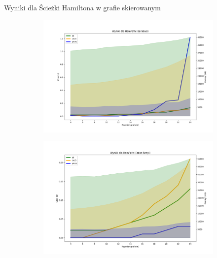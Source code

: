 \begin{frame}{Wyniki dla Ścieżki Hamiltona w grafie skierowanym}
\begin{figure}[htbp]
	\centering
	\begin{subfigure}[b]{0.5\textwidth}
		\includegraphics[width=\textwidth]{../thesis/figures/1-barabasi-plot.png}
	\end{subfigure}
	\begin{subfigure}[b]{0.49\textwidth}
		\includegraphics[width=\textwidth]{../thesis/figures/1-erdos-renyi-plot.png}
	\end{subfigure}
\end{figure}
\end{frame}
	
